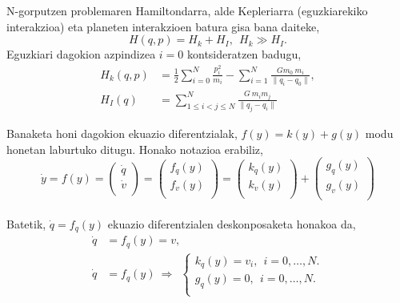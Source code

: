 N-gorputzen problemaren Hamiltondarra, alde Kepleriarra (eguzkiarekiko interakzioa) eta planeten interakzioen batura gisa bana daiteke,
\begin{equation*}
H(q,p)=H_k+H_I, \ \ H_k \gg H_I.
\end{equation*} 
Eguzkiari dagokion azpindizea $i=0$ kontsideratzen badugu, 
\begin{align*}
H_k(q,p) &=\frac{1}{2} \sum\limits_{i=0}^{N} \frac{p_i^2}{m_i}-  \sum\limits_{i=1}^{N} \frac{Gm_0 \ m_i}{\|q_i-q_0\|}, \\
H_I(q) &=\sum\limits_{1\leq i < j \leq N}^{N} \frac{G \ m_i m_j}{\|q_j-q_i\|}
\end{align*}

Banaketa honi dagokion ekuazio diferentzialak,  $f(y)=k(y)+g(y)$ modu honetan laburtuko ditugu. Honako notazioa erabiliz,
\begin{equation*}
\dot{y}=f(y)=
\left(\begin{array}{c}
  \dot{q} \\
  \dot{v} \\
\end{array}\right)=
\left(\begin{array}{c}
  f_q(y) \\
  f_v(y) \\
\end{array}\right)=
\left(\begin{array}{c}
  k_q(y) \\
  k_v(y) \\
\end{array}\right)+
\left(\begin{array}{c}
  g_q(y) \\
  g_v(y) \\
\end{array}\right)
\end{equation*}

\paragraph*{}Batetik, $\dot{q}=f_q(y)$ ekuazio diferentzialen deskonposaketa honakoa da,
\begin{align*}
\dot{q}&=f_q(y)=v, \\
\dot{q}&=f_q(y) \ \Rightarrow \ \ 
\left \{ \begin{array}{c}
  k_q(y) =v_i, \ \ i=0,\dots,N. \\[.25cm]
  g_q(y) =0,\ \ i=0,\dots,N.\\
\end{array} \right.  
\end{align*}

